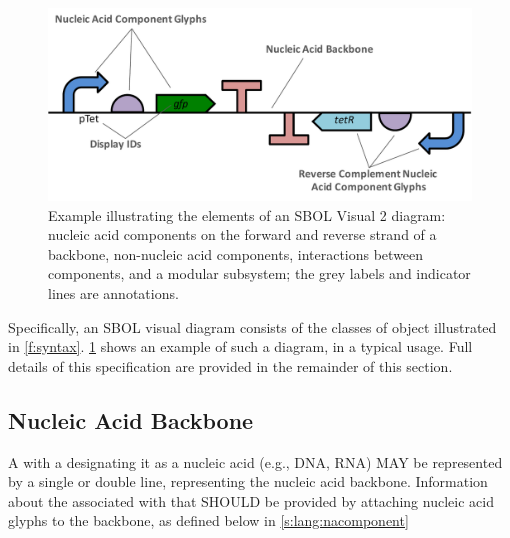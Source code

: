 \begin{figure}[h!]
\centering
\includegraphics[width=6in]{figures/SBOLgeneral.pdf}
\caption{Example illustrating the elements of an SBOL Visual 2 diagram: nucleic acid components on the forward and reverse strand of a backbone, non-nucleic acid components,  interactions between components, and a modular subsystem; the grey labels and indicator lines are annotations.}
\label{f:example}
\end{figure}

Specifically, an SBOL visual diagram consists of the classes of object illustrated in \ref{f:syntax}.
\ref{f:example} shows an example of such a diagram, in a typical usage.
Full details of this specification are provided in the remainder of this section.


\subsection{Nucleic Acid Backbone}
\label{s:lang:backbone}

A  with a  designating it as a nucleic acid (e.g., DNA, RNA) MAY be represented by a single or double line, representing the nucleic acid backbone. 
Information about the  associated with that  SHOULD be provided by attaching nucleic acid glyphs to the backbone, as defined below in \ref{s:lang:nacomponent}

